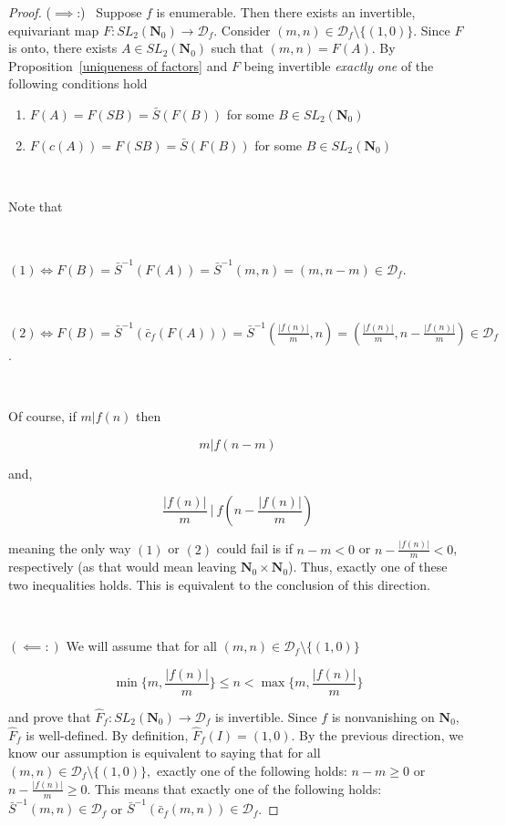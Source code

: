 \documentclass{article}
\begin{document}
\begin{proof}
($\implies$:) \ Suppose $f$ is enumerable. Then there exists an invertible, equivariant map $F: SL_2(\mathbf{N}_0) \rightarrow \mathcal{D}_f$. Consider $ (m, n) \in \mathcal{D}_f \setminus \{(1,0)\}$. Since $F$ is onto, there exists $A \in SL_2(\mathbf{N}_0)$ such that $(m, n) = F(A)$. By Proposition~\ref{uniqueness of factors} and $F$ being invertible \textit{exactly one} of the following conditions hold

\begin{enumerate}
    \item $F(A) = F(SB) = \bar{S}(F(B))$ for some $B \in SL_2(\mathbf{N}_0)$
    \item $F(c(A)) = F(SB) = \bar{S}(F(B))$ for some $B \in SL_2(\mathbf{N}_0)$
\end{enumerate}

\

Note that

\

$(1) \iff F(B) = \bar{S}^{-1}(F(A)) = \bar{S}^{-1}(m, n) = (m, n-m) \in \mathcal{D}_f$.

\

$(2) \iff F(B) = \bar{S}^{-1}(\bar{c}_f(F(A))) = \bar{S}^{-1}(\frac{|f(n)|}{m}, n) = (\frac{|f(n)|}{m}, n - \frac{|f(n)|}{m}) \in \mathcal{D}_f$.

\

Of course, if $m \lvert f(n)$ then

$$m \lvert f(n-m)$$

and,

$$\frac{|f(n)|}{m} \ \lvert  \  f(n - \frac{|f(n)|}{m} )$$

meaning the only way $(1)$ or $(2)$ could fail is if $n - m < 0$ or $n - \frac{|f(n)|}{m} < 0$, respectively (as that would mean leaving $\mathbf{N}_0 \times \mathbf{N}_0$). Thus, exactly one of these two inequalities holds. This is equivalent to the conclusion of this direction.

\

$(\impliedby:)$ We will assume that for all $(m, n) \in \mathcal{D}_f \setminus \{(1, 0) \}$ 

$$\min \{m, \frac{|f(n)|}{m} \} \leq n < \max \{m, \frac{|f(n)|}{m} \}$$

and prove that $\hat{F}_f: SL_2(\mathbf{N}_0) \rightarrow \mathcal{D}_f$ is invertible. Since $f$ is nonvanishing on $\mathbf{N}_0$, $\hat{F}_f$ is well-defined. By definition, $\hat{F}_f(I) = (1,0)$. By the previous direction, we know our assumption is equivalent to saying that for all $(m, n) \in \mathcal{D}_f \setminus \{(1,0)\},$ exactly one of the following holds: $n - m \geq 0$ or $n - \frac{|f(n)|}{m} \geq 0$. This means that exactly one of the following holds: $\bar{S}^{-1}(m, n) \in \mathcal{D}_f$ or $\bar{S}^{-1}(\bar{c}_f(m,n)) \in \mathcal{D}_f$.


\end{proof}
\end{document}
